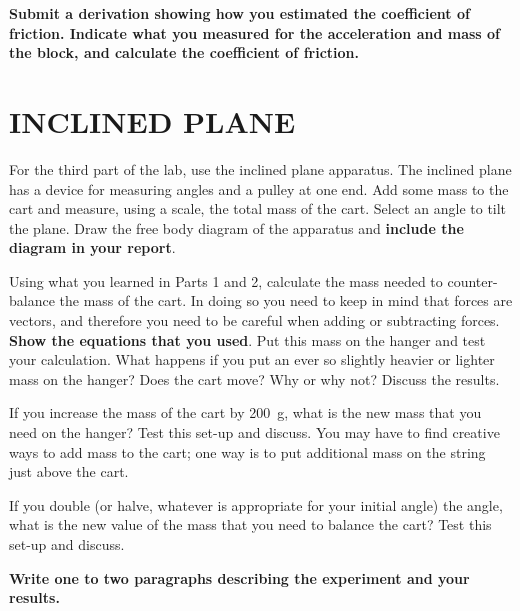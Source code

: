 \documentclass[11pt,letterpaper]{article}
\begin{document}
\textbf{Submit a derivation showing how you estimated the coefficient of friction. Indicate what you measured for the acceleration and mass of the block, and calculate the coefficient of friction.} 

\section{INCLINED PLANE}
For the third part of the lab, use the inclined plane apparatus.  The inclined plane has a device for measuring angles and a pulley at one end. Add some mass to the cart and measure, using a scale, the total mass of the cart. Select an angle to tilt the plane.  Draw the free body diagram of the apparatus and \textbf{include the diagram in your report}.

Using what you learned in Parts 1 and 2, calculate the mass needed to counter-balance the mass of the cart. In doing so you need to keep in mind that forces are vectors, and therefore you need to be careful when adding or subtracting forces. \textbf{Show the equations that you used}. Put this mass on the hanger and test your calculation. What happens if you put an ever so slightly heavier or lighter mass on the hanger? Does the cart move? Why or why not? Discuss the results.

If you increase the mass of the cart by 200~g, what is the new mass that you need on the hanger?  Test this set-up and discuss. You may have to find creative ways to add mass to the cart; one way is to put additional mass on the string just above the cart.

If you double (or halve, whatever is appropriate for your initial
angle) the angle, what is the new value of the mass that you need to balance the cart?  Test this set-up and discuss.
 
\textbf{Write one to two paragraphs describing the experiment and your results.}


\end{document}
